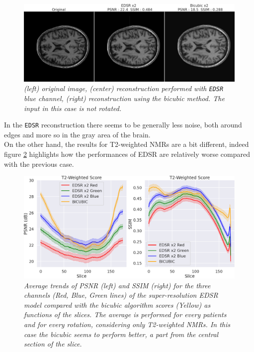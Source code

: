 \documentclass[12pt,a4paper]{report}
\begin{document}
\begin{figure}[H]
 \centering
 \includegraphics[scale=0.3]{./images/edsr-comp-images.png}
 \caption{\it (left) original image, (center) reconstruction performed with {\tt EDSR} blue channel, (right) reconstruction using the bicubic method. The input in this case is not rotated.}
 \label{fig:edsr-upscale}
\end{figure}

In the {\tt EDSR} reconstruction there seems to be generally less noise, both around edges and more so in the gray area of the brain. 
\\
On the other hand, the results for T2-weighted NMRs are a bit different, indeed figure \ref{fig:edsr-score-slide-t2} highlights how the performances of EDSR are relatively worse compared with the previous case.

\begin{figure}[H]
 \centering
 \includegraphics[scale=0.3]{./images/EDSR_score_slide_t2_all.png}
 \caption{\it Average trends of PSNR (left) and SSIM (right) for the three channels (Red, Blue, Green lines) of the super-resolution EDSR model compared with the bicubic algorithm scores (Yellow) as functions of the slices. The average is performed for every patients and for every rotation,  considering only T2-weighted NMRs. In this case the bicubic seems to perform better, a part from the central section of the slice.}
 \label{fig:edsr-score-slide-t2}
\end{figure}
\end{document}
